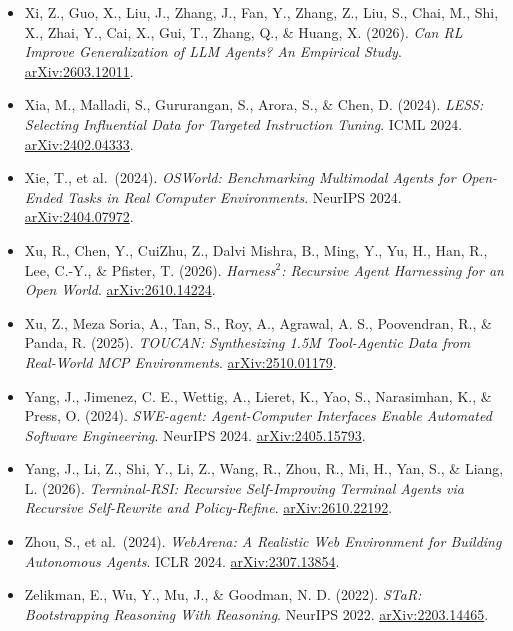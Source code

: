 \documentclass[
  10pt,
]{article}
\begin{document}
\begin{itemize}
\item
  Xi, Z., Guo, X., Liu, J., Zhang, J., Fan, Y., Zhang, Z., Liu, S.,
  Chai, M., Shi, X., Zhai, Y., Cai, X., Gui, T., Zhang, Q., \& Huang, X.
  (2026). \emph{Can RL Improve Generalization of LLM Agents? An
  Empirical Study}.
  \href{https://arxiv.org/abs/2603.12011}{arXiv:2603.12011}.
\item
  Xia, M., Malladi, S., Gururangan, S., Arora, S., \& Chen, D. (2024).
  \emph{LESS: Selecting Influential Data for Targeted Instruction
  Tuning}. ICML 2024.
  \href{https://arxiv.org/abs/2402.04333}{arXiv:2402.04333}.
\item
  Xie, T., et al.~(2024). \emph{OSWorld: Benchmarking Multimodal Agents
  for Open-Ended Tasks in Real Computer Environments}. NeurIPS 2024.
  \href{https://arxiv.org/abs/2404.07972}{arXiv:2404.07972}.
\item
  Xu, R., Chen, Y., CuiZhu, Z., Dalvi Mishra, B., Ming, Y., Yu, H., Han,
  R., Lee, C.-Y., \& Pfister, T. (2026). \emph{Harness\(^2\): Recursive
  Agent Harnessing for an Open World}.
  \href{https://arxiv.org/abs/2610.14224}{arXiv:2610.14224}.
\item
  Xu, Z., Meza Soria, A., Tan, S., Roy, A., Agrawal, A. S., Poovendran,
  R., \& Panda, R. (2025). \emph{TOUCAN: Synthesizing 1.5M Tool-Agentic
  Data from Real-World MCP Environments}.
  \href{https://arxiv.org/abs/2510.01179}{arXiv:2510.01179}.
\item
  Yang, J., Jimenez, C. E., Wettig, A., Lieret, K., Yao, S., Narasimhan,
  K., \& Press, O. (2024). \emph{SWE-agent: Agent-Computer Interfaces
  Enable Automated Software Engineering}. NeurIPS 2024.
  \href{https://arxiv.org/abs/2405.15793}{arXiv:2405.15793}.
\item
  Yang, J., Li, Z., Shi, Y., Li, Z., Wang, R., Zhou, R., Mi, H., Yan,
  S., \& Liang, L. (2026). \emph{Terminal-RSI: Recursive Self-Improving
  Terminal Agents via Recursive Self-Rewrite and Policy-Refine}.
  \href{https://arxiv.org/abs/2610.22192}{arXiv:2610.22192}.
\item
  Zhou, S., et al.~(2024). \emph{WebArena: A Realistic Web Environment
  for Building Autonomous Agents}. ICLR 2024.
  \href{https://arxiv.org/abs/2307.13854}{arXiv:2307.13854}.
\item
  Zelikman, E., Wu, Y., Mu, J., \& Goodman, N. D. (2022). \emph{STaR:
  Bootstrapping Reasoning With Reasoning}. NeurIPS 2022.
  \href{https://arxiv.org/abs/2203.14465}{arXiv:2203.14465}.
\end{itemize}
\end{document}
